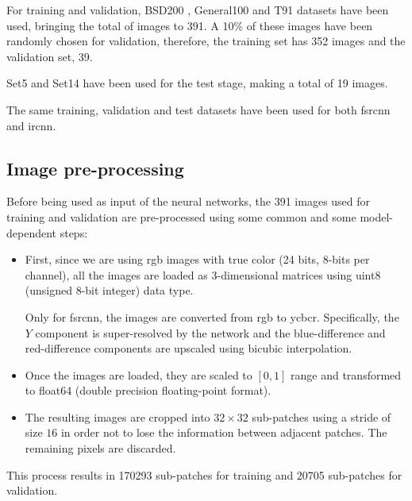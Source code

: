 For training and validation, BSD200 \cite{BSDS}, General100 \cite{FSRCNN} and T91 \cite{T91} datasets have been used, bringing the total of images to 391. A 10\% of these images have been randomly chosen for validation, therefore, the training set has 352 images and the validation set, 39.

Set5 \cite{SET5} and Set14 \cite{SET14} have been used for the test stage, making a total of 19 images.

The same training, validation and test datasets have been used for both \gls{fsrcnn} and \gls{ircnn}. 


\subsection{Image pre-processing}
Before being used as input of the neural networks, the 391 images used for training and validation are pre-processed using some common and some model-dependent steps:
\begin{itemize}
	\item First, since we are using \gls{rgb} images with true color (24 bits, 8-bits per channel), all the images are loaded as 3-dimensional matrices using uint8 (unsigned 8-bit integer) data type.
	
	Only for \gls{fsrcnn}, the images are converted from \gls{rgb} to \gls{ycbcr}. Specifically, the $Y$ component is super-resolved by the network and the blue-difference and red-difference components are upscaled using bicubic interpolation.
	
	\item Once the images are loaded, they are scaled to $[0,1]$ range and transformed to float64 (double precision floating-point format). 
	
	\item The resulting images are cropped into $32\times32$ sub-patches using a stride of size $16$ in order not to lose the information between adjacent patches. The remaining pixels are discarded.
\end{itemize}

This process results in 170293 sub-patches for training and 20705 sub-patches for validation.


